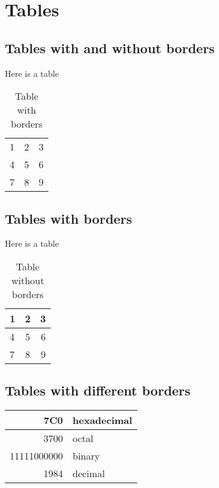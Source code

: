 \chapter{Tables}
\section{Tables with and without borders}
Here is a table

\begin{table}[h]
\caption{Table with borders}
\begin{tabular}{l c r}
1 & 2 & 3 \\
4 & 5 & 6 \\
7 & 8 & 9 \\
\end{tabular}
\end{table}


\section{Tables with borders}
Here is a table

\begin{table}[h]
\caption{Table without borders}
\begin{tabular}{|l|c| r|}
\hline
1 & 2 & 3 \\ \hline
4 & 5 & 6 \\ \hline
7 & 8 & 9 \\ \hline
\end{tabular}
\end{table}

\section{Tables with different borders}

\begin{tabular}{|r|l|}
  \hline
  7C0 & hexadecimal \\\hline
  3700 & octal \\ \cline{2-2}
  11111000000 & binary \\  \hline \hline
  1984 & decimal \\   \hline
\end{tabular}



